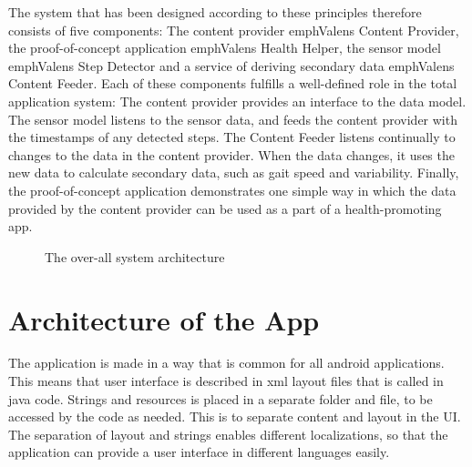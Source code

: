 The system that has been designed according to these principles therefore consists of five components: The content provider emph{Valens Content Provider}, the proof-of-concept application emph{Valens Health Helper}, the sensor model emph{Valens Step Detector} and a service of deriving secondary data emph{Valens Content Feeder}. Each of these components fulfills a well-defined role in the total application system: The content provider provides an interface to the data model. The sensor model listens to the sensor data, and feeds the content provider with the timestamps of any detected steps. The Content Feeder listens continually to changes to the data in the content provider. When the data changes, it uses the new data to calculate secondary data, such as gait speed and variability. Finally, the proof-of-concept application demonstrates one simple way in which the data provided by the content provider can be used as a part of a health-promoting app.

\begin{figure}[p]

\setlength\fboxsep{0pt}
\setlength\fboxrule{1pt}\noindent{}
\label{fig:Architecture}
\caption{The over-all system architecture}
\end{figure}


\section{Architecture of the App}
The application is made in a way that is common for all android applications. This means that user interface is described in xml layout files that is called in java code. Strings and resources is placed in a separate folder and file, to be accessed by the code as needed. This is to separate content and layout in the UI. The separation of layout and strings enables different localizations, so that the application can provide a user interface in different languages easily.

